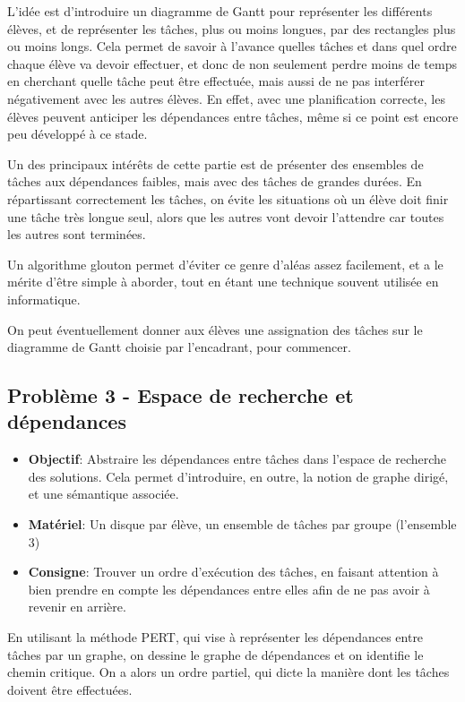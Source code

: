 \documentclass{article}
\begin{document}
L'idée est d'introduire un diagramme de Gantt pour représenter les différents élèves, et de représenter les tâches, plus ou moins longues, par des rectangles plus ou moins longs. Cela permet de savoir à l'avance quelles tâches et dans quel ordre chaque élève va devoir effectuer, et donc de non seulement perdre moins de temps en cherchant quelle tâche peut être effectuée, mais aussi de ne pas interférer négativement avec les autres élèves. En effet, avec une planification correcte, les élèves peuvent anticiper les dépendances entre tâches, même si ce point est encore peu développé à ce stade.

Un des principaux intérêts de cette partie est de présenter des ensembles de tâches aux dépendances faibles, mais avec des tâches de grandes durées. En répartissant correctement les tâches, on évite les situations où un élève doit finir une tâche très longue seul, alors que les autres vont devoir l'attendre car toutes les autres sont terminées.

Un algorithme glouton permet d'éviter ce genre d'aléas assez facilement, et a le mérite d'être simple à aborder, tout en étant une technique souvent utilisée en informatique.

On peut éventuellement donner aux élèves une assignation des tâches sur le diagramme de Gantt choisie par l'encadrant, pour commencer.

\subsection{Problème 3 - Espace de recherche et dépendances}

\begin{itemize}
    \item \textbf{Objectif}: Abstraire les dépendances entre tâches dans l'espace de recherche des solutions. Cela permet d'introduire, en outre, la notion de graphe dirigé, et une sémantique associée.
    \item \textbf{Matériel}: Un disque par élève, un ensemble de tâches par groupe (l'ensemble 3)
    \item \textbf{Consigne}: Trouver un ordre d'exécution des tâches, en faisant attention à bien prendre en compte les dépendances entre elles afin de ne pas avoir à revenir en arrière.
\end{itemize}

En utilisant la méthode PERT, qui vise à représenter les dépendances entre tâches par un graphe, on dessine le graphe de dépendances et on identifie le chemin critique. On a alors un ordre partiel, qui dicte la manière dont les tâches doivent être effectuées.
\end{document}
